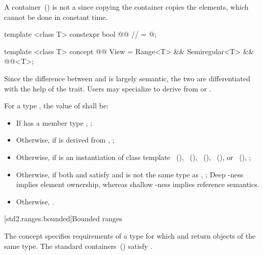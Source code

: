 A container~() is not a  since copying the
container copies the elements, which cannot be done in constant time.
\exitexample

\begin{itemdecl}
template <class T>
constexpr bool @@ // \expos
  = @\seebelow@;

template <class T>
concept @@ View =
  Range<T> &&
  Semiregular<T> &&
  @@<T>;
\end{itemdecl}

\begin{itemdescr}
\pnum
Since the difference between  and  is largely semantic, the
two are differentiated with the help of the 
trait. Users may specialize 
to derive from  or .

\pnum
For a type , the value of  shall be:
\begin{itemize}
\item If  has a member type , ;
\item Otherwise, if  is derived from , ;
\item Otherwise, if  is an instantiation of class template
~(),
~(),
~(),
~(), or
~(), ;
\item Otherwise, if both  and  satisfy  and
 is not the same type as ,
; \enternote Deep -ness implies element ownership, whereas shallow -ness
implies reference semantics. \exitnote
\item Otherwise, .
\end{itemize}
\end{itemdescr}

[std2.ranges.bounded]{Bounded ranges}

\pnum
The  concept specifies requirements
of a  type for which  and  return objects of
the same type. \enternote The standard containers~()
satisfy .\exitnote

